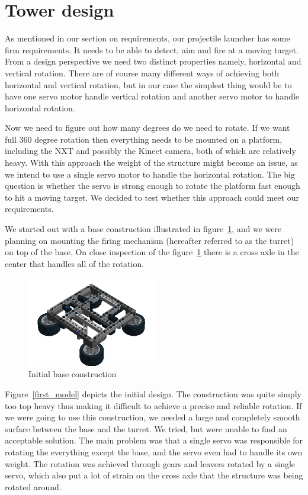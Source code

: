 \section{Tower design}
As mentioned in our section on requirements, our projectile launcher has some firm requirements. It needs to be able to detect, aim and fire at a moving target. 
From a design perspective we need two distinct properties namely, horizontal and vertical rotation. There are of course many different ways of achieving both horizontal and vertical rotation, but in our case the simplest thing would be to have one servo motor handle vertical rotation and another servo motor to handle horizontal rotation. 

Now we need to figure out how many degrees do we need to rotate. If we want full 360 degree rotation then everything needs to be mounted on a platform, including the NXT and possibly the Kinect camera, both of which are relatively heavy. With this approach the weight of the structure might become an issue, as we intend to use a single servo motor to handle the horizontal rotation. The big question is whether the servo is strong enough to rotate the platform fast enough to hit a moving target. We decided to test whether this approach could meet our requirements.

 We started out with a base construction illustrated in figure~\ref{base}, and we were planning on mounting the firing mechanism (hereafter referred to as the turret) on top of the base. On close inspection of the figure~\ref{base} there is a cross axle in the center that handles all of the rotation.

\begin{figure}[hptb]
  \centering
    \includegraphics[width=0.5\textwidth]{img/base.png}
  \caption{Initial base construction}
  \label{base}
\end{figure}

Figure~\ref{first_model} depicts the initial design. The construction was quite simply too top heavy thus making it difficult to achieve a precise and reliable rotation. If we were going to use this construction, we needed a large and completely smooth surface between the base and the turret. We tried, but were unable to find an acceptable solution. The main problem was that a single servo was responsible for rotating the everything except the base, and the servo even had to handle its own weight. The rotation was achieved through gears and leavers rotated by a single servo, which also put a lot of strain on the cross axle that the structure was being rotated around.


